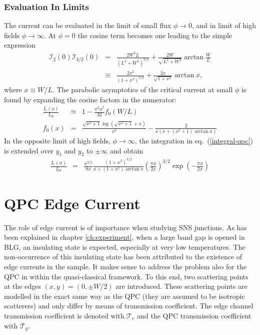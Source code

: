 \subsubsection*{Evaluation In Limits}
The current can be evaluated in the limit of small flux $\phi \rightarrow 0$, and in limit of high fields $\phi \rightarrow \infty$. 
At $\phi=0$ the cosine term becomes one leading to the simple expression
\begin{eqnarray}
\mathcal{I}_2(0)\mathcal{I}_{3/2}(0) &=&
\frac{2 W^2 L}{\left( L^2 + W^2 \right)^{3/2}} + \frac{2W}{\sqrt{L^2 + W^2}} \arctan \frac{W}{L}  \\
&\equiv & \frac{2 x^2}{\left( 1 + x^2 \right)^{3/2}} + \frac{2 x}{\sqrt{1 + x^2} } \arctan x,
\label{Ic-0}
\end{eqnarray}
where $x \equiv W/L$.
The parabolic asymptotics of the critical current at small $\phi$ is found by expanding the cosine factors in the numerator:
\begin{eqnarray}
\frac{I_c(\phi)}{I_{c0}}&\simeq& 1 - \frac{\pi ^2 \phi^2 }{32} f_0(W/L) \\
f_0(x) &=& \frac{\sqrt{x^2+1} \log \left(\sqrt{x^2+1}+x\right)}{x^3} - \frac{2}{x (x+(x^2+1) \arctan x)} 
\end{eqnarray}
In the opposite limit of high fields, $\phi\to \infty$, the integration in eq.~(\ref{integral-qpc}) is extended over $y_1$ and $y_2$ to $\pm \infty$ and obtain
\begin{eqnarray}
\frac{I_c(\phi)}{I_{c0}} &=& \frac{\pi^{3/2}}{8 x} \frac{(1 + x^2)^{3/2}}{x + (1+x^2) \arctan x} \left( \frac{\pi \phi}{2 x} \right)^{3/2} \exp \left( - \frac{\pi \phi}{2 x} \right)
\label{eq:large-phi}
\end{eqnarray}


\section{QPC Edge Current}
The role of edge current is of importance when studying SNS junctions. As has been explained in chapter \ref{ch:experiment}, when a large band gap is opened in BLG, an insulating state is expected, especially at very low temperatures. The non-occurrence of this insulating state has been attributed to the existence of edge currents in the sample. It makes sense to address the problem also for the QPC in within the quasi-classical framework. To this end, two scattering points at the edges $(x, y) = (0, \pm W/2)$ are introduced. These scattering points are modelled in the exact same way as the QPC (they are assumed to be isotropic scatterers) and only differ by means of transmission coefficient. The edge channel transmission coefficient is denoted with $\mathcal{T}_e$ and the QPC transmission coefficient with $\mathcal{T}_q$. 

